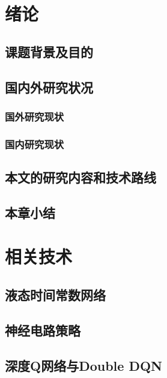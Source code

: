 \documentclass{article}
\begin{document}

    \clearpage
    \sanhaolineskip
    \section{绪论}
        \subsection{课题背景及目的}
            
        \subsection{国内外研究状况}
            \subsubsection{国外研究现状}
                
            \subsubsection{国内研究现状}
                
        \subsection{本文的研究内容和技术路线}
            
        \subsection{本章小结}
            

    \clearpage
    \sanhaolineskip
    \section{相关技术}
        \subsection{液态时间常数网络}
            
        \subsection{神经电路策略}
            
        \subsection{深度Q网络与Double DQN}
            
\end{document}
